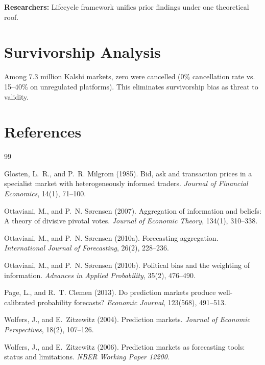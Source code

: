 \documentclass[a4paper,11pt]{article}
\theoremstyle{plain}
\theoremstyle{definition}
\begin{document}
\textbf{Researchers:} Lifecycle framework unifies prior findings under one theoretical roof.

\section{Survivorship Analysis}
\label{sec:survivorship}

Among 7.3 million Kalshi markets, zero were cancelled (0\% cancellation rate vs. 15--40\% on unregulated platforms). This eliminates survivorship bias as threat to validity.

\newpage

\section*{References}

\begin{thebibliography}{99}

Glosten, L.~R., and P.~R. Milgrom (1985).
\newblock Bid, ask and transaction prices in a specialist market with heterogeneously informed traders.
\newblock \textit{Journal of Financial Economics}, 14(1), 71--100.

Ottaviani, M., and P.~N. Sørensen (2007).
\newblock Aggregation of information and beliefs: A theory of divisive pivotal votes.
\newblock \textit{Journal of Economic Theory}, 134(1), 310--338.

Ottaviani, M., and P.~N. Sørensen (2010a).
\newblock Forecasting aggregation.
\newblock \textit{International Journal of Forecasting}, 26(2), 228--236.

Ottaviani, M., and P.~N. Sørensen (2010b).
\newblock Political bias and the weighting of information.
\newblock \textit{Advances in Applied Probability}, 35(2), 476--490.

Page, L., and R.~T. Clemen (2013).
\newblock Do prediction markets produce well-calibrated probability forecasts?
\newblock \textit{Economic Journal}, 123(568), 491--513.

Wolfers, J., and E.~Zitzewitz (2004).
\newblock Prediction markets.
\newblock \textit{Journal of Economic Perspectives}, 18(2), 107--126.

Wolfers, J., and E.~Zitzewitz (2006).
\newblock Prediction markets as forecasting tools: status and limitations.
\newblock \textit{NBER Working Paper 12200}.

\end{thebibliography}
\end{document}
